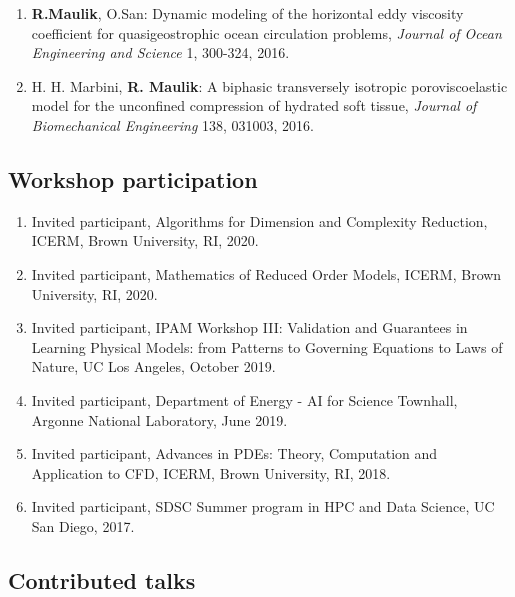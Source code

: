 \documentclass[letterpaper]{article}
\begin{document}
\begin{enumerate}
\item \textbf{R.Maulik}, O.San: Dynamic modeling of the horizontal eddy viscosity coefficient for quasigeostrophic ocean circulation problems, {\it Journal of Ocean Engineering and Science} 1, 300-324, 2016.

\item H. H. Marbini, \textbf{R. Maulik}: A biphasic transversely isotropic poroviscoelastic model for the unconfined compression of hydrated soft tissue, {\it Journal of Biomechanical Engineering} 138, 031003, 2016.

\end{enumerate}

\subsection*{Workshop participation}

\begin{enumerate}
	  \item Invited participant, Algorithms for Dimension and Complexity Reduction, ICERM, Brown University, RI, 2020.

    \item Invited participant, Mathematics of Reduced Order Models, ICERM, Brown University, RI, 2020.

    \item Invited participant, IPAM Workshop III: Validation and Guarantees in Learning Physical Models: from Patterns to Governing Equations to Laws of Nature, UC Los Angeles, October 2019.
    
    \item Invited participant, Department of Energy - AI for Science Townhall, Argonne National Laboratory, June 2019.
    
    \item Invited participant, Advances in PDEs: Theory, Computation and Application to CFD, ICERM, Brown University, RI, 2018.

    \item Invited participant, SDSC Summer program in HPC and Data Science, UC San Diego, 2017.
\end{enumerate}

\subsection*{Contributed talks}
\end{document}
